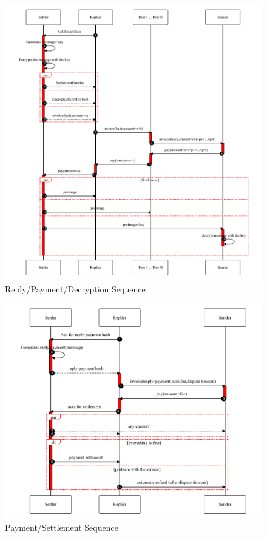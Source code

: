 \documentclass{article}
\begin{document}
\begin{figure}
	\centering
	\includegraphics[scale=0.8]{ReplyAndPay.pdf}
	\caption{Reply/Payment/Decryption Sequence}
	\label{fig:replyandpay}
\end{figure}

\begin{figure}
	\centering
	\includegraphics[scale=0.8]{PayForService.pdf}
	\caption{Payment/Settlement Sequence}
	\label{fig:payforservice}
\end{figure}
\end{document}
